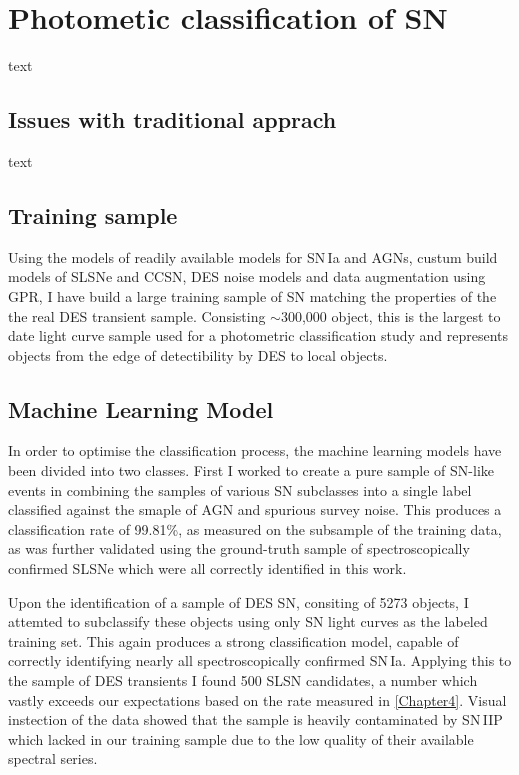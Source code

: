 \section{Photometic classification of SN}
text

\subsection{Issues with traditional apprach}
text

\subsection{Training sample}
Using the models of readily available models for SN\,Ia and AGNs, custum build models of SLSNe and CCSN, DES noise models and data augmentation using GPR, I have build a large training sample of SN matching the properties of the the real DES transient sample. Consisting $\sim$300,000 object, this is the largest to date light curve sample used for a photometric classification study and represents objects from the edge of detectibility by DES to local objects.

\subsection{Machine Learning Model}
In order to optimise the classification process, the machine learning models have been divided into two classes. First I worked to create a pure sample of SN-like events in combining the samples of various SN subclasses into a single label classified against the smaple of AGN and spurious survey noise. This produces a classification rate of 99.81\%, as measured on the subsample of the training data, as was further validated using the ground-truth sample of spectroscopically confirmed SLSNe which were all correctly identified in this work.

Upon the identification of a sample of DES SN, consiting of 5273 objects, I attemted to subclassify these objects using only SN light curves as the labeled training set. This again produces a strong classification model, capable of correctly identifying nearly all spectroscopically confirmed SN\,Ia. Applying this to the sample of DES transients I found 500 SLSN candidates, a number which vastly exceeds our expectations based on the rate measured in \cref{Chapter4}. Visual instection of the data showed that the sample is heavily contaminated by SN\,IIP which lacked in our training sample due to the low quality of their available spectral series.

